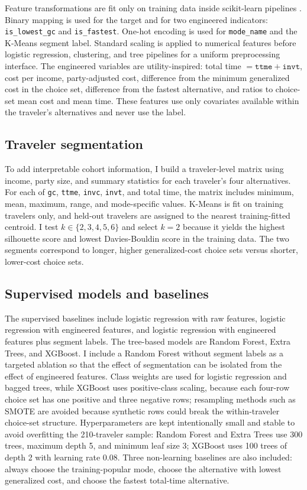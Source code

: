\documentclass{article}
\begin{document}
Feature transformations are fit only on training data inside scikit-learn pipelines \citep{pedregosa2011}.  Binary mapping is used for the target and for two engineered indicators: \texttt{is\_lowest\_gc} and \texttt{is\_fastest}.  One-hot encoding is used for \texttt{mode\_name} and the K-Means segment label.  Standard scaling is applied to numerical features before logistic regression, clustering, and tree pipelines for a uniform preprocessing interface.  The engineered variables are utility-inspired: total time $=\texttt{ttme}+\texttt{invt}$, cost per income, party-adjusted cost, difference from the minimum generalized cost in the choice set, difference from the fastest alternative, and ratios to choice-set mean cost and mean time.  These features use only covariates available within the traveler's alternatives and never use the label.

\subsection{Traveler segmentation}
To add interpretable cohort information, I build a traveler-level matrix using income, party size, and summary statistics for each traveler's four alternatives.  For each of \texttt{gc}, \texttt{ttme}, \texttt{invc}, \texttt{invt}, and total time, the matrix includes minimum, mean, maximum, range, and mode-specific values.  K-Means is fit on training travelers only, and held-out travelers are assigned to the nearest training-fitted centroid.  I test $k\in\{2,3,4,5,6\}$ and select $k=2$ because it yields the highest silhouette score and lowest Davies-Bouldin score in the training data.  The two segments correspond to longer, higher generalized-cost choice sets versus shorter, lower-cost choice sets.

\subsection{Supervised models and baselines}
The supervised baselines include logistic regression with raw features, logistic regression with engineered features, and logistic regression with engineered features plus segment labels.  The tree-based models are Random Forest, Extra Trees, and XGBoost.  I include a Random Forest without segment labels as a targeted ablation so that the effect of segmentation can be isolated from the effect of engineered features.  Class weights are used for logistic regression and bagged trees, while XGBoost uses positive-class scaling, because each four-row choice set has one positive and three negative rows; resampling methods such as SMOTE are avoided because synthetic rows could break the within-traveler choice-set structure.  Hyperparameters are kept intentionally small and stable to avoid overfitting the 210-traveler sample: Random Forest and Extra Trees use 300 trees, maximum depth 5, and minimum leaf size 3; XGBoost uses 100 trees of depth 2 with learning rate 0.08.  Three non-learning baselines are also included: always choose the training-popular mode, choose the alternative with lowest generalized cost, and choose the fastest total-time alternative.
\end{document}
